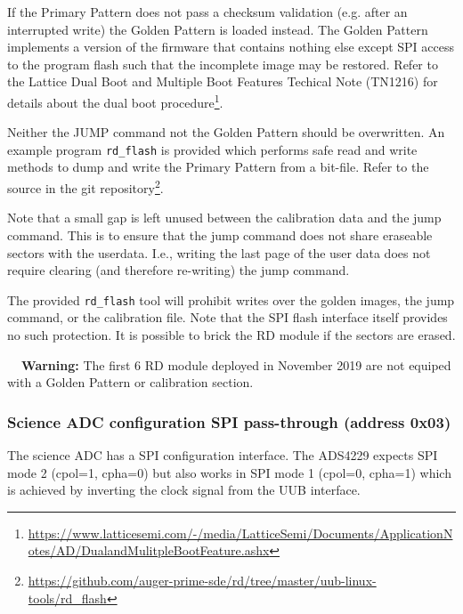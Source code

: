 \documentclass[a4paper,indent]{paper}
\newenvironment{warning}
{\par\begin{mdframed}[linewidth=2pt,linecolor=orange,backgroundcolor=orange!10]%
    \begin{list}{}{\leftmargin=0mm}\item[\bf\danger{}~~Warning: ]}
  {\end{list}\end{mdframed}\par}
\begin{document}
If the Primary Pattern does not pass a checksum validation (e.g. after an interrupted write) the Golden Pattern is loaded instead. The Golden Pattern implements a version of the firmware that contains nothing else except SPI access to the program flash such that the incomplete image may be restored.
Refer to the Lattice Dual Boot and Multiple Boot Features Techical Note (TN1216) for details about the dual boot procedure\footnote{\url{https://www.latticesemi.com/-/media/LatticeSemi/Documents/ApplicationNotes/AD/DualandMulitpleBootFeature.ashx}}.

Neither the JUMP command not the Golden Pattern should be overwritten.
An example program \texttt{rd\_flash} is provided which performs safe read and write methods to dump and write the Primary Pattern from a bit-file.
Refer to the source in the git repository\footnote{\url{https://github.com/auger-prime-sde/rd/tree/master/uub-linux-tools/rd_flash}}.

Note that a small gap is left unused between the calibration data and the jump command. This is to ensure that the jump command does not share eraseable sectors with the userdata. I.e., writing the last page of the user data does not require clearing (and therefore re-writing) the jump command.

The provided \texttt{rd\_flash} tool will prohibit writes over the golden images, the jump command, or the calibration file. Note that the SPI flash interface itself provides no such protection. It is possible to brick the RD module if the sectors are erased.

\begin{warning}
  The first 6 RD module deployed in November 2019 are not equiped with a Golden Pattern or calibration section.
\end{warning}



\subsubsection{Science ADC configuration SPI pass-through (address 0x03)}
The science \ac{ADC} has a \ac{SPI} configuration interface. The ADS4229 expects \ac{SPI} mode 2 (cpol=1, cpha=0) but also works in \ac{SPI} mode 1 (cpol=0, cpha=1) which is achieved by inverting the clock signal from the \ac{UUB} interface.
\end{document}
